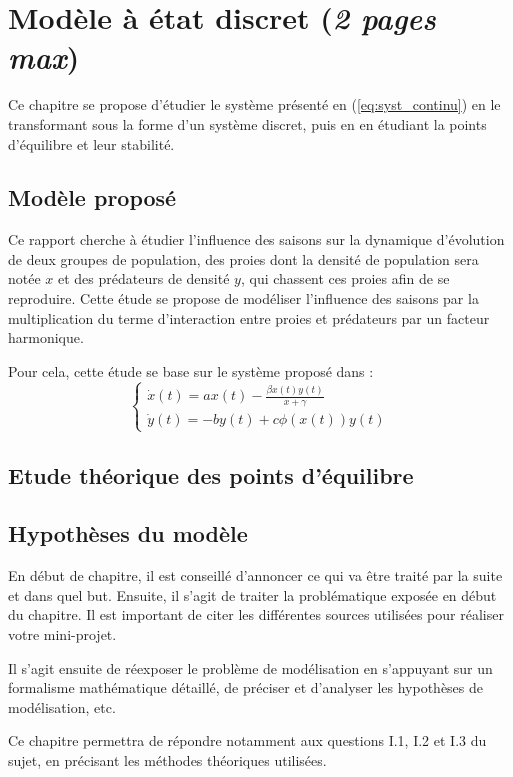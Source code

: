 \chapter{Modèle à état discret (\textit{2 pages max})}
\label{ch:modele_discret}

Ce chapitre se propose d'étudier le système présenté en (\ref{eq:syst_continu}) en le transformant sous la forme d'un système discret, puis en en étudiant la points d'équilibre et leur stabilité.

\section{Modèle proposé}

Ce rapport cherche à étudier l'influence des saisons sur la dynamique d'évolution de deux groupes de population, des proies dont la densité de population sera notée $x$ et des prédateurs de densité $y$, qui chassent ces proies afin de se reproduire. Cette étude se propose de modéliser l'influence des saisons par la multiplication du terme d'interaction entre proies et prédateurs par un facteur harmonique.

Pour cela, cette étude se base sur le système proposé dans \cite{ChaosControl} :
\begin{equation}
    \begin{cases}
        \dot{x}(t) = a x(t) - \frac{\beta x(t) y(t)}{x + \gamma}  \\
        \dot{y}(t) = -b y(t) + c \phi (x(t)) y(t)
    \end{cases}
\end{equation}
\section{Etude théorique des points d'équilibre}

\section{Hypothèses du modèle}


En début de chapitre, il est conseillé d'annoncer ce qui va être traité par la suite et dans quel but. Ensuite, il s’agit de traiter la problématique exposée en début du chapitre. Il est important de citer les différentes sources utilisées pour réaliser votre mini-projet.

Il s’agit ensuite de réexposer le problème de modélisation en s’appuyant sur un formalisme mathématique détaillé, de préciser et d'analyser les hypothèses de modélisation, etc.

Ce chapitre permettra de répondre notamment aux questions I.1, I.2 et I.3 du sujet, en précisant les méthodes théoriques utilisées.